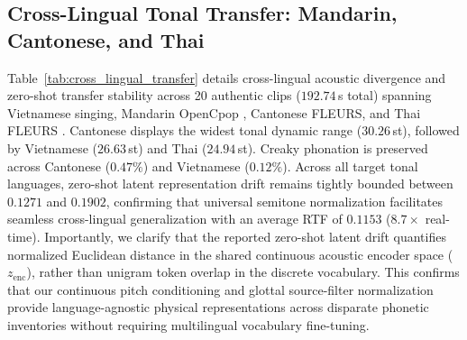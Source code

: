\subsection{Cross-Lingual Tonal Transfer: Mandarin, Cantonese, and Thai}
Table~\ref{tab:cross_lingual_transfer} details cross-lingual acoustic divergence and zero-shot transfer stability across 20 authentic clips ($192.74$\,s total) spanning Vietnamese singing, Mandarin OpenCpop \cite{wang2022opencpop}, Cantonese FLEURS, and Thai FLEURS \cite{conneau2023fleurs}. Cantonese displays the widest tonal dynamic range ($30.26$\,st), followed by Vietnamese ($26.63$\,st) and Thai ($24.94$\,st). Creaky phonation is preserved across Cantonese ($0.47\%$) and Vietnamese ($0.12\%$). Across all target tonal languages, zero-shot latent representation drift remains tightly bounded between $0.1271$ and $0.1902$, confirming that universal semitone normalization facilitates seamless cross-lingual generalization with an average RTF of $0.1153$ ($8.7\times$ real-time). Importantly, we clarify that the reported zero-shot latent drift quantifies normalized Euclidean distance in the shared continuous acoustic encoder space ($z_{\text{enc}}$), rather than unigram token overlap in the discrete vocabulary. This confirms that our continuous pitch conditioning and glottal source-filter normalization provide language-agnostic physical representations across disparate phonetic inventories without requiring multilingual vocabulary fine-tuning.

\begin{table}[t]
\centering
\caption{Cross-lingual tonal divergence and zero-shot latent stability across Asian tonal languages (20 authentic clips, 192.74s audio).}
\label{tab:cross_lingual_transfer}
\end{table}

